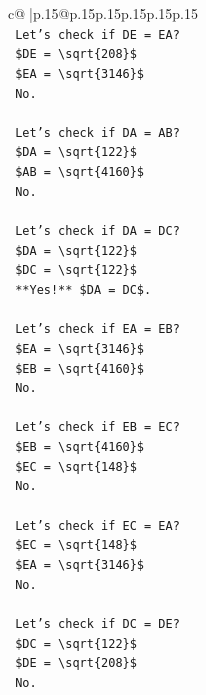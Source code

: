 \documentclass{article}
\begin{document}
{\begin{supertabular}{c@{$\;$}|p{.15\linewidth}@{}p{.15\linewidth}p{.15\linewidth}p{.15\linewidth}p{.15\linewidth}p{.15\linewidth}}
{{{\\ 
\texttt{    Let's check if DE = EA?} \\
\texttt{    \$DE = \textbackslash{}sqrt\{208\}\$} \\
\texttt{    \$EA = \textbackslash{}sqrt\{3146\}\$} \\
\texttt{    No.} \\
\\ 
\texttt{    Let's check if DA = AB?} \\
\texttt{    \$DA = \textbackslash{}sqrt\{122\}\$} \\
\texttt{    \$AB = \textbackslash{}sqrt\{4160\}\$} \\
\texttt{    No.} \\
\\ 
\texttt{    Let's check if DA = DC?} \\
\texttt{    \$DA = \textbackslash{}sqrt\{122\}\$} \\
\texttt{    \$DC = \textbackslash{}sqrt\{122\}\$} \\
\texttt{    **Yes!** \$DA = DC\$.} \\
\\ 
\texttt{    Let's check if EA = EB?} \\
\texttt{    \$EA = \textbackslash{}sqrt\{3146\}\$} \\
\texttt{    \$EB = \textbackslash{}sqrt\{4160\}\$} \\
\texttt{    No.} \\
\\ 
\texttt{    Let's check if EB = EC?} \\
\texttt{    \$EB = \textbackslash{}sqrt\{4160\}\$} \\
\texttt{    \$EC = \textbackslash{}sqrt\{148\}\$} \\
\texttt{    No.} \\
\\ 
\texttt{    Let's check if EC = EA?} \\
\texttt{    \$EC = \textbackslash{}sqrt\{148\}\$} \\
\texttt{    \$EA = \textbackslash{}sqrt\{3146\}\$} \\
\texttt{    No.} \\
\\ 
\texttt{    Let's check if DC = DE?} \\
\texttt{    \$DC = \textbackslash{}sqrt\{122\}\$} \\
\texttt{    \$DE = \textbackslash{}sqrt\{208\}\$} \\
\texttt{    No.} \\
}}}
\end{supertabular}}
\end{document}
